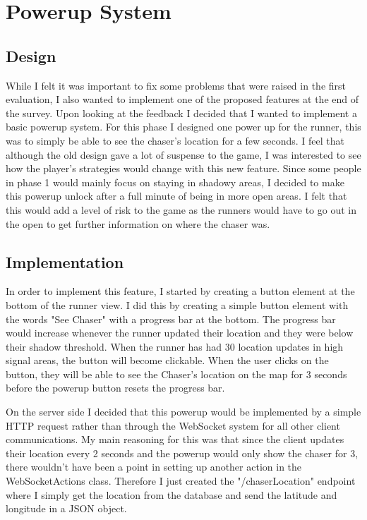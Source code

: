 \documentclass{l4proj}
\begin{document}
\section{Powerup System}

\subsection{Design}
While I felt it was important to fix some problems that were raised in the first evaluation, I also
wanted to implement one of the proposed features at the end of the survey. Upon looking at the feedback
I decided that I wanted to implement a basic powerup system. For this phase I designed one power up for
the runner, this was to simply be able to see the chaser's location for a few seconds. I feel that although
the old design gave a lot of suspense to the game, I was interested to see how the player's strategies
would change with this new feature. Since some people in phase 1 would mainly focus on staying in shadowy
areas, I decided to make this powerup unlock after a full minute of being in more open areas. I felt that
this would add a level of risk to the game as the runners would have to go out in the open to get further
information on where the chaser was.

\subsection{Implementation}
In order to implement this feature, I started by creating a button element at the bottom of the runner view.
I did this by creating a simple button element with the words "See Chaser" with a progress bar at the bottom.
The progress bar would increase whenever the runner updated their location and they were below their shadow
threshold. When the runner has had 30 location updates in high signal areas, the button will become clickable.
When the user clicks on the button, they will be able to see the Chaser's location on the map for 3 seconds before
the powerup button resets the progress bar.

On the server side I decided that this powerup would be implemented by a simple HTTP request rather than through
the WebSocket system for all other client communications. My main reasoning for this was that since the client
updates their location every 2 seconds and the powerup would only show the chaser for 3, there wouldn't have been
a point in setting up another action in the WebSocketActions class. Therefore I just created the "/chaserLocation"
endpoint where I simply get the location from the database and send the latitude and longitude in a JSON object.
\end{document}

